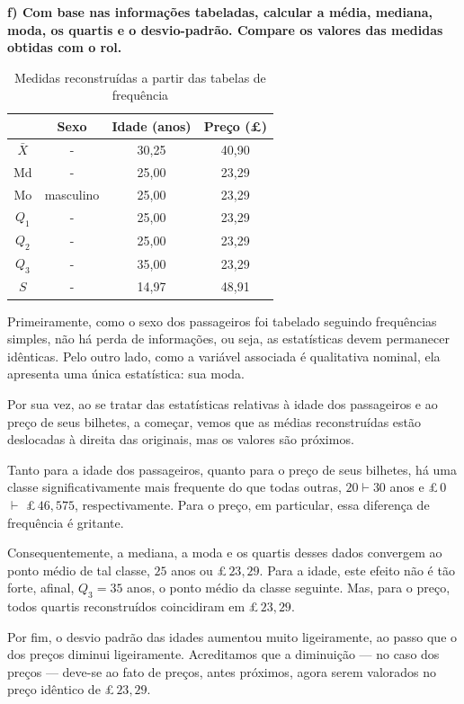 \documentclass[brazil, a4paper, 11pt]{article}
\begin{document}
	\vspace*{\baselineskip}

	\noindent\textbf{f) Com base nas informações tabeladas, calcular a média, mediana, moda, os quartis e o desvio-padrão. Compare os valores das medidas obtidas com o rol.}
	\begin{table}[H]
		\centering
		\caption{Medidas reconstruídas a partir das tabelas de frequência}
		\begin{tabular}{c|ccc}
			\toprule
						& Sexo		& Idade (anos)	& Preço (\pounds)	\\
			\midrule
			$\bar{X}$	& -			& 30,25			& 40,90 			\\
			Md			& -			& 25,00			& 23,29 			\\
			Mo			& masculino	& 25,00			& 23,29				\\
			$Q_1$		& -			& 25,00			& 23,29				\\
			$Q_2$		& -			& 25,00			& 23,29				\\
			$Q_3$		& -			& 35,00			& 23,29				\\
			$S$			& -			& 14,97			& 48,91				\\
			\bottomrule
		\end{tabular}
	\end{table}
	Primeiramente, como o sexo dos passageiros foi tabelado seguindo frequências simples, não há perda de informações, ou seja, as estatísticas devem permanecer idênticas. Pelo outro lado, como a variável associada é qualitativa nominal, ela apresenta uma única estatística: sua moda.

	Por sua vez, ao se tratar das estatísticas relativas à idade dos passageiros e ao preço de seus bilhetes, a começar, vemos que as médias reconstruídas estão deslocadas à direita das originais, mas os valores são próximos.

	Tanto para a idade dos passageiros, quanto para o preço  de seus bilhetes, há uma classe significativamente mais frequente do que todas outras, $20 \vdash 30$ anos e \pounds\,$0$ $\vdash$ \pounds\,$46,575$, respectivamente. Para o preço, em particular, essa diferença de frequência é gritante.

	Consequentemente, a mediana, a moda e os quartis desses dados convergem ao ponto médio de tal classe, $25$ anos ou \pounds\,$23,29$. Para a idade, este efeito não é tão forte, afinal, $Q_3 = 35$ anos, o ponto médio da classe seguinte. Mas, para o preço, todos quartis reconstruídos coincidiram em \pounds\,$23,29$.

	Por fim, o desvio padrão das idades aumentou muito ligeiramente, ao passo que o dos preços diminui ligeiramente. Acreditamos que a diminuição --- no caso dos preços --- deve-se ao fato de preços, antes próximos, agora serem valorados no preço idêntico de \pounds\,$23,29$.
	\vspace*{2\baselineskip}
	
\end{document}
